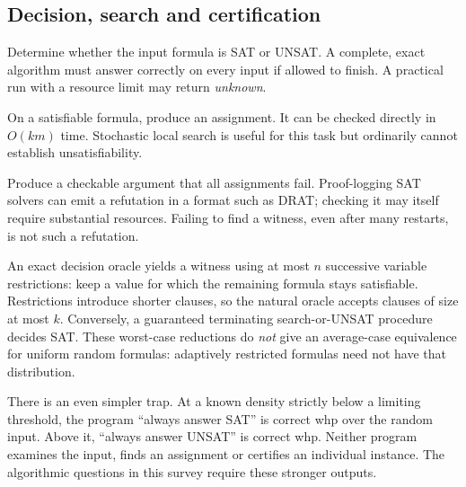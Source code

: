 \subsection{Decision, search and certification}
\begin{description}[style=nextline,leftmargin=1em,labelindent=0pt]
\item[Decision:] Determine whether the input formula is SAT or UNSAT.
A complete, exact algorithm must answer correctly on every input if allowed
to finish. A practical run with a resource limit may return \emph{unknown}.
\item[Witness search:] On a satisfiable formula, produce an assignment.
It can be checked directly in $O(km)$ time. Stochastic local search is useful
for this task but ordinarily cannot establish unsatisfiability.
\item[UNSAT certification:] Produce a checkable argument that all assignments
fail. Proof-logging SAT solvers can emit a refutation in a format such as DRAT;
checking it may itself require substantial resources. Failing to find a
witness, even after many restarts, is not such a refutation.
\end{description}

An exact decision oracle yields a witness using at most $n$ successive variable
restrictions: keep a value for which the remaining formula stays satisfiable.
Restrictions introduce shorter clauses, so the natural oracle accepts clauses
of size at most $k$. Conversely, a guaranteed terminating search-or-UNSAT
procedure decides SAT. These worst-case reductions do \emph{not} give an
average-case equivalence for uniform random formulas: adaptively restricted
formulas need not have that distribution.

There is an even simpler trap. At a known density strictly below a limiting
threshold, the program ``always answer SAT'' is correct whp over the random
input. Above it, ``always answer UNSAT'' is correct whp. Neither program
examines the input, finds an assignment or certifies an individual instance.
The algorithmic questions in this survey require these stronger outputs.

